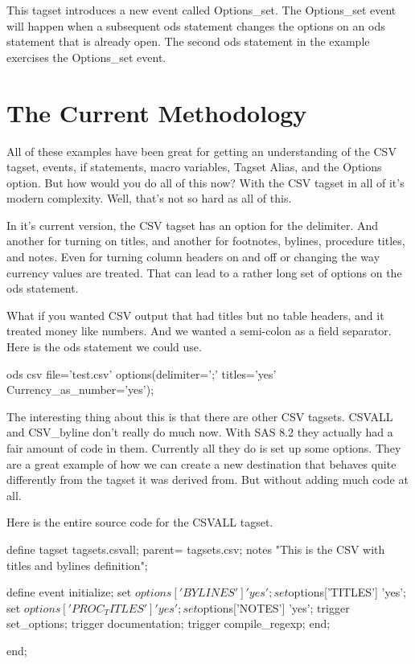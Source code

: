 This tagset introduces a new event called Options\_set.  The Options\_set
event will happen when a subsequent ods statement changes the options
on an ods statement that is already open.  The second ods statement in
the example exercises the Options\_set event.


\section{The Current Methodology}

All of these examples have been great for getting an understanding of the
CSV tagset, events, if statements, macro variables, Tagset Alias, and the
Options option.  But how would you do all of this now?  With the CSV tagset
in all of it's modern complexity.  Well, that's not so hard as all of this.

In it's current version, the CSV tagset has an option for the delimiter. 
And another for turning on titles,  and another for footnotes, bylines, 
procedure titles, and notes.  Even for turning column headers on and off
or changing the way currency values are treated.  That can lead to a rather
long set of options on the ods statement.

What if you wanted CSV output that had titles but no table headers, and it
treated money like numbers.  And we wanted a semi-colon as a field separator.
Here is the ods statement we could use.

\begin{sfvcode}
    ods csv file='test.csv'
            options(delimiter=';' titles='yes' Currency_as_number='yes');
\end{sfvcode}

The interesting thing about this is that there are other CSV tagsets.  CSVALL
and CSV\_byline don't really do much now.  With SAS 8.2 they actually had a
fair amount of code in them.  Currently all they do is set up some options.
They are a great example of how we can create a new destination that behaves
quite differently from the tagset it was derived from.  But without adding 
much code at all.

Here is the entire source code for the CSVALL tagset.

\begin{sfvcode}
    define tagset tagsets.csvall;
        parent= tagsets.csv;
        notes "This is the CSV with titles and bylines definition";

        define event initialize;
            set $options['BYLINES'] 'yes';
            set $options['TITLES'] 'yes';
            set $options['PROC_TITLES'] 'yes';
            set $options['NOTES'] 'yes';
            trigger set_options;
            trigger documentation;
            trigger compile_regexp;
        end;

    end;
\end{sfvcode}

